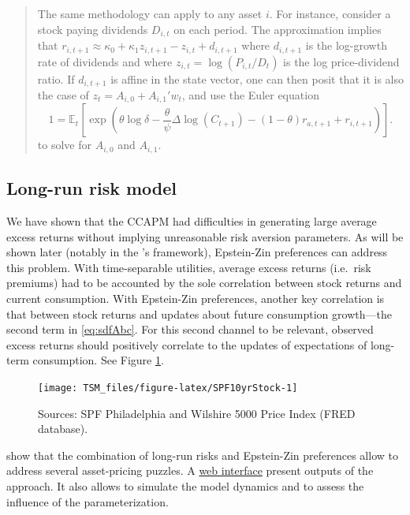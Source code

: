 \documentclass[
  12pt,
]{book}
\theoremstyle{definition}
\theoremstyle{definition}
\theoremstyle{definition}
\theoremstyle{definition}
\theoremstyle{remark}
\begin{document}
\begin{quote}
The same methodology can apply to any asset \(i\). For instance, consider a stock paying dividends \(D_{i,t}\) on each period. The \citet{Campbell_Shiller_1988} approximation implies that \(r_{i,t+1} \approx \kappa_0 + \kappa_1 z_{i,t+1} - z_{i,t} + d_{i,t+1}\) where \(d_{i,t+1}\) is the log-growth rate of dividends and where \(z_{i,t} = \log(P_{i,t}/D_t)\) is the log price-dividend ratio. If \(d_{i,t+1}\) is affine in the state vector, one can then posit that it is also the case of \(z_t= A_{i,0}+A_{i,1}'w_t\), and use the Euler equation
\begin{equation}
1 = \mathbb{E}_t \left[ \exp\left(\theta \log \delta - \frac{\theta}{\psi} \Delta \log(C_{t+1}) - (1 - \theta) r_{a,t+1} + r_{i,t+1} \right) \right].\label{eq:sdfRi}
\end{equation}
to solve for \(A_{i,0}\) and \(A_{i,1}\).
\end{quote}

\hypertarget{long-run-risk-model}{%
\subsection{Long-run risk model}\label{long-run-risk-model}}

We have shown that the CCAPM had difficulties in generating large average excess returns without implying unreasonable risk aversion parameters.
As will be shown later (notably in the \citet{Bansal_Yaron_2004}'s framework), Epstein-Zin preferences can address this problem.
With time-separable utilities, average excess returns (i.e.~risk premiums) had to be accounted by the sole correlation between stock returns and current consumption.
With Epstein-Zin preferences, another key correlation is that between stock returns and updates about future consumption growth---the second term in \eqref{eq:sdfAbc}.
For this second channel to be relevant, observed excess returns should positively correlate to the updates of expectations of long-term consumption. See Figure \ref{fig:SPF10yrStock}.

\begin{figure}
\texttt{[image: TSM\_files/figure-latex/SPF10yrStock-1]} \caption{Sources: SPF Philadelphia and Wilshire 5000 Price Index (FRED database).}\label{fig:SPF10yrStock}
\end{figure}

\citet{Bansal_Yaron_2004} show that the combination of long-run risks and Epstein-Zin preferences allow to address several asset-pricing puzzles. A \href{https://jrenne.shinyapps.io/LRRModels}{web interface} present outputs of the approach. It also allows to simulate the model dynamics and to assess the influence of the parameterization.
\end{document}
